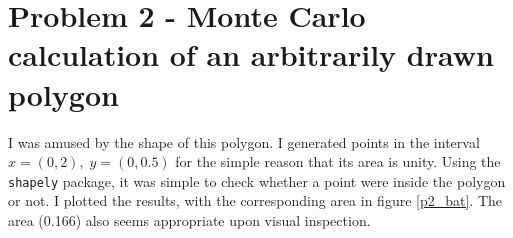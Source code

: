 \documentclass[a4paper,11pt]{article}
\begin{document}
\begin{titlepage}
  \centering
  \begin{figure}[H]
  \end{figure}
\end{titlepage}


\section{Problem 2 - Monte Carlo calculation of an arbitrarily drawn polygon}
I was amused by the shape of this polygon.
I generated points in the interval $x = (0,2), \; y = (0, 0.5)$ for the simple reason that its area is unity.
Using the \texttt{shapely} package, it was simple to check whether a point were inside the polygon or not.
I plotted the results, with the corresponding area in figure \ref{p2_bat}.
The area (0.166) also seems appropriate upon visual inspection.
\end{document}
